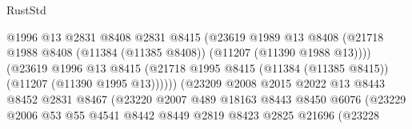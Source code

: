 \begin{lexlean}{RustStd}
\begin{coremodule}
                                          @1996
                                          @13
                                          @2831
                                          @8408
                                          @2831
                                          @8415
                                          (@23619
                                            @1989
                                            @13
                                            @8408
                                            (@21718
                                              @1988
                                              @8408
                                              (@11384 (@11385 @8408))
                                              (@11207 (@11390 @1988 @13))))
                                          (@23619
                                            @1996
                                            @13
                                            @8415
                                            (@21718
                                              @1995
                                              @8415
                                              (@11384 (@11385 @8415))
                                              (@11207 (@11390 @1995 @13))))))
                                      (@23209
                                        @2008
                                        @2015
                                        @2022
                                        @13
                                        @8443
                                        @8452
                                        @2831
                                        @8467
                                        (@23220
                                          @2007
                                          @489
                                          @18163
                                          @8443
                                          @8450
                                          @6076
                                          (@23229
                                            @2006
                                            @53
                                            @55
                                            @4541
                                            @8442
                                            @8449
                                            @2819
                                            @8423
                                            @2825
                                            @21696
                                            (@23228

\end{coremodule}
\end{lexlean}
